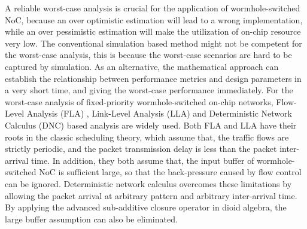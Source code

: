 \documentclass[10pt,journal]{IEEEtran}
\begin{document}
A reliable worst-case analysis is crucial for the application of wormhole-switched NoC, because an over optimistic estimation will lead to a wrong implementation, while an over pessimistic estimation will make the utilization of on-chip resource very low. The conventional simulation based method might not be competent for the worst-case analysis, this is because the worst-case scenarios are hard to be captured by simulation. As an alternative, the mathematical approach can establish the relationship between performance metrics and design parameters in a very short time, and giving the worst-case performance immediately. For the worst-case analysis of fixed-priority wormhole-switched on-chip networks, Flow-Level Analysis (FLA) \cite{Shi:2008:RCA:1397757.1397996}, Link-Level Analysis (LLA) \cite{73}\cite{189} and Deterministic Network Calculus (DNC) \cite{Qian489900} based analysis are widely used. Both FLA and LLA have their roots in the classic scheduling theory, which assume that, the traffic flows are strictly periodic, and the packet transmission delay is less than the packet inter-arrival time. In addition, they both assume that, the input buffer of wormhole-switched NoC is sufficient large, so that the back-pressure caused by flow control can be ignored. Deterministic network calculus overcomes these limitations by allowing the packet arrival at arbitrary pattern and arbitrary inter-arrival time. By applying the advanced sub-additive closure operator in dioid algebra, the large buffer assumption can also be eliminated.
\end{document}
